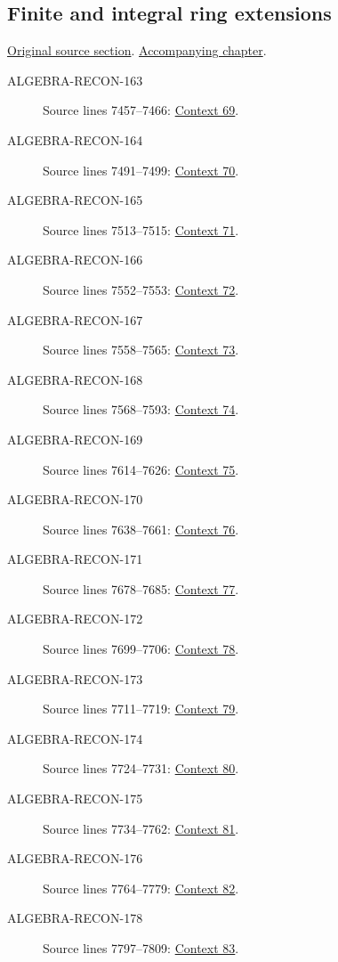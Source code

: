 \subsection{Finite and integral ring extensions}
\hypertarget{algebra-source-section-finite-ring-extensions}{}
\noindent\href{https://github.com/stacks/stacks-project/blob/a04446e57ec1fbc252a871afcec7752fb2807b14/algebra.tex\#L7434}{Original source section}. \href{algebra.pdf\#nameddest=section-finite-ring-extensions}{Accompanying chapter}.

\begin{description}
\item[ALGEBRA-RECON-163] Source lines 7457--7466: \hyperlink{algebra-context-069}{Context 69}.
\item[ALGEBRA-RECON-164] Source lines 7491--7499: \hyperlink{algebra-context-070}{Context 70}.
\item[ALGEBRA-RECON-165] Source lines 7513--7515: \hyperlink{algebra-context-071}{Context 71}.
\item[ALGEBRA-RECON-166] Source lines 7552--7553: \hyperlink{algebra-context-072}{Context 72}.
\item[ALGEBRA-RECON-167] Source lines 7558--7565: \hyperlink{algebra-context-073}{Context 73}.
\item[ALGEBRA-RECON-168] Source lines 7568--7593: \hyperlink{algebra-context-074}{Context 74}.
\item[ALGEBRA-RECON-169] Source lines 7614--7626: \hyperlink{algebra-context-075}{Context 75}.
\item[ALGEBRA-RECON-170] Source lines 7638--7661: \hyperlink{algebra-context-076}{Context 76}.
\item[ALGEBRA-RECON-171] Source lines 7678--7685: \hyperlink{algebra-context-077}{Context 77}.
\item[ALGEBRA-RECON-172] Source lines 7699--7706: \hyperlink{algebra-context-078}{Context 78}.
\item[ALGEBRA-RECON-173] Source lines 7711--7719: \hyperlink{algebra-context-079}{Context 79}.
\item[ALGEBRA-RECON-174] Source lines 7724--7731: \hyperlink{algebra-context-080}{Context 80}.
\item[ALGEBRA-RECON-175] Source lines 7734--7762: \hyperlink{algebra-context-081}{Context 81}.
\item[ALGEBRA-RECON-176] Source lines 7764--7779: \hyperlink{algebra-context-082}{Context 82}.
\item[ALGEBRA-RECON-178] Source lines 7797--7809: \hyperlink{algebra-context-083}{Context 83}.

\end{description}
